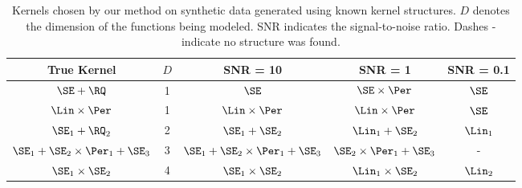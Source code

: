 %
%
\begin{table*}[ht!]
\caption[Kernels chosen on synthetic data generated using known kernel structures]
{%
Kernels chosen by our method on synthetic data generated using known kernel structures. $D$ denotes the dimension of the functions being modeled.  SNR indicates the signal-to-noise ratio. Dashes - indicate no structure was found.
}
\label{tbl:synthetic}
\begin{center}
{\small
\begin{tabular}{c c | c c c}
True Kernel & $D$ & SNR = 10 & SNR = 1 & \hspace{-1cm} SNR = 0.1 \\
\hline
$\SE + \RQ$                               & 1 
                                              & $\SE$
                                              & $\SE \times \Per$
                                              & $\SE$
                                              \\
$\Lin \times \Per$                        & 1 
                                              & $\Lin \times \Per$
                                              & $\Lin \times \Per$
                                              & $\SE$
                                              \\
$\SE_1 + \RQ_2$                           & 2 
                                              & $\SE_1 + \SE_2$
                                              & $\Lin_1 + \SE_2$ 
                                              & $\Lin_1$
                                              \\
$\SE_1 + \SE_2 \times \Per_1 + \SE_3$     & 3 
                                              & $\SE_1 + \SE_2 \times \Per_1 + \SE_3$
                                              & $\SE_2 \times \Per_1 + \SE_3$
                                              & -
                                              \\
$\SE_1 \times \SE_2$                      & 4 
                                              & $\SE_1 \times \SE_2$
                                              & $\Lin_1 \times \SE_2$
                                              & $\Lin_2$

\end{tabular}}
\end{center}
\end{table*}
